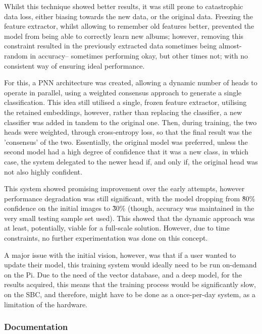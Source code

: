                 Whilst this technique showed better results, it was still prone to catastrophic data loss, either biasing towards the new data, or the original data. Freezing the feature extractor, whilst allowing to remember old features better, prevented the model from being able to correctly learn new albums; however, removing this constraint resulted in the previously extracted data sometimes being almost-random in accuracy-- sometimes performing okay, but other times not; with no consistent way of ensuring ideal performance.
    
                For this, a PNN architecture was created, allowing a dynamic number of heads to operate in parallel, using a weighted consensus approach to generate a single classification. This idea still utilised a single, frozen feature extractor, utilising the retained embeddings, however, rather than replacing the classifier, a new classifier was added in tandem to the original one. Then, during training, the two heads were weighted, through cross-entropy loss, so that the final result was the 'consensus' of the two. Essentially, the original model was preferred, unless the second model had a high degree of confidence that it was a new class, in which case, the system delegated to the newer head if, and only if, the original head was not also highly confident.
    
                This system showed promising improvement over the early attempts, however performance degradation was still significant, with the model dropping from \~80\% confidence on the initial images to \~30\% (though, accuracy was maintained in the very small testing sample set used). This showed that the dynamic approach was at least, potentially,  viable for a full-scale solution. However, due to time constraints, no further experimentation was done on this concept.
    
                A major issue with the initial vision, however, was that if a user wanted to update their model, this training system would ideally need to be run on-demand on the Pi. Due to the need of the vector database, and a deep model, for the results acquired, this means that the training process would be significantly slow, on the SBC, and therefore, might have to be done as a once-per-day system, as a limitation of the hardware.
    
            \subsubsection{Documentation}
    

